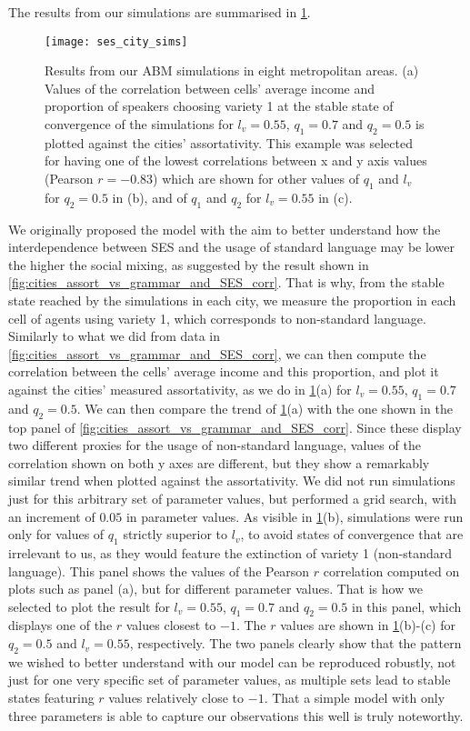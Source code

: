 \documentclass[../thesis.tex]{subfiles}
\begin{document}
The results from our simulations are summarised in \cref{fig:ses_city_sims}.
\begin{figure}
\centering
  \texttt{[image: ses\_city\_sims]}
  \caption{Results from our \ac{ABM} simulations in eight metropolitan areas.
  (a) Values of the correlation between cells' average income and proportion of speakers choosing variety 1 at the stable state of convergence of the simulations for $l_v = 0.55$, $q_1 = 0.7$ and $q_2 = 0.5$ is plotted against the cities' assortativity.
  This example was selected for having one of the lowest correlations between x and y axis values (Pearson $r = -0.83$) which are shown for other values of $q_1$ and $l_v$ for $q_2 = 0.5$ in (b), and of $q_1$ and $q_2$ for $l_v = 0.55$ in (c).}
  \label{fig:ses_city_sims}
\end{figure}
We originally proposed the model with the aim to better understand how the interdependence between \ac{SES} and the usage of standard language may be lower the higher the social mixing, as suggested by the result shown in \cref{fig:cities_assort_vs_grammar_and_SES_corr}.
That is why, from the stable state reached by the simulations in each city, we measure the proportion in each cell of agents using variety 1, which corresponds to non-standard language.
Similarly to what we did from data in \cref{fig:cities_assort_vs_grammar_and_SES_corr}, we can then compute the correlation between the cells' average income and this proportion, and plot it against the cities' measured assortativity, as we do in \cref{fig:ses_city_sims}(a) for $l_v = 0.55$, $q_1 = 0.7$ and $q_2 = 0.5$.
We can then compare the trend of \cref{fig:ses_city_sims}(a) with the one shown in the top panel of \cref{fig:cities_assort_vs_grammar_and_SES_corr}.
Since these display two different proxies for the usage of non-standard language, values of the correlation shown on both y axes are different, but they show a remarkably similar trend when plotted against the assortativity.
We did not run simulations just for this arbitrary set of parameter values, but performed a grid search, with an increment of $0.05$ in parameter values.
As visible in \cref{fig:ses_city_sims}(b), simulations were run only for values of $q_1$ strictly superior to $l_v$, to avoid states of convergence that are irrelevant to us, as they would feature the extinction of variety 1 (non-standard language).
This panel shows the values of the Pearson $r$ correlation computed on plots such as panel (a), but for different parameter values.
That is how we selected to plot the result for $l_v = 0.55$, $q_1 = 0.7$ and $q_2 = 0.5$ in this panel, which displays one of the $r$ values closest to $-1$.
The $r$ values are shown in \cref{fig:ses_city_sims}(b)-(c) for $q_2 = 0.5$ and $l_v = 0.55$, respectively.
The two panels clearly show that the pattern we wished to better understand with our model can be reproduced robustly, not just for one very specific set of parameter values, as multiple sets lead to stable states featuring $r$ values relatively close to $-1$.
That a simple model with only three parameters is able to capture our observations this well is truly noteworthy.
\end{document}
